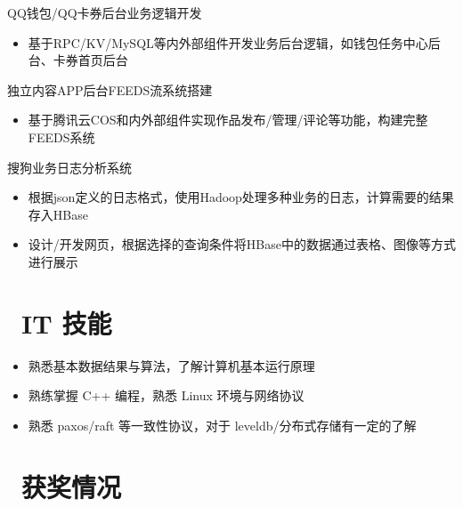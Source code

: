 \documentclass{resume}
\begin{document}
\begin{onehalfspacing}
QQ钱包/QQ卡券后台业务逻辑开发
\begin{itemize}
  \item 基于RPC/KV/MySQL等内外部组件开发业务后台逻辑，如钱包任务中心后台、卡券首页后台
\end{itemize}

独立内容APP后台FEEDS流系统搭建
\begin{itemize}
  \item 基于腾讯云COS和内外部组件实现作品发布/管理/评论等功能，构建完整FEEDS系统
\end{itemize}
\end{onehalfspacing}
%
\begin{onehalfspacing}
搜狗业务日志分析系统
\begin{itemize}
  \item 根据json定义的日志格式，使用Hadoop处理多种业务的日志，计算需要的结果存入HBase
  \item 设计/开发网页，根据选择的查询条件将HBase中的数据通过表格、图像等方式进行展示
\end{itemize}
\end{onehalfspacing}


\section{\faCogs\ IT 技能}
\begin{itemize}[parsep=0.5ex]
  \item 熟悉基本数据结果与算法，了解计算机基本运行原理
  \item 熟练掌握 C++ 编程，熟悉 Linux 环境与网络协议
  \item 熟悉 paxos/raft 等一致性协议，对于 leveldb/分布式存储有一定的了解
\end{itemize}

\section{\faHeartO\ 获奖情况}


%
%
\end{document}
